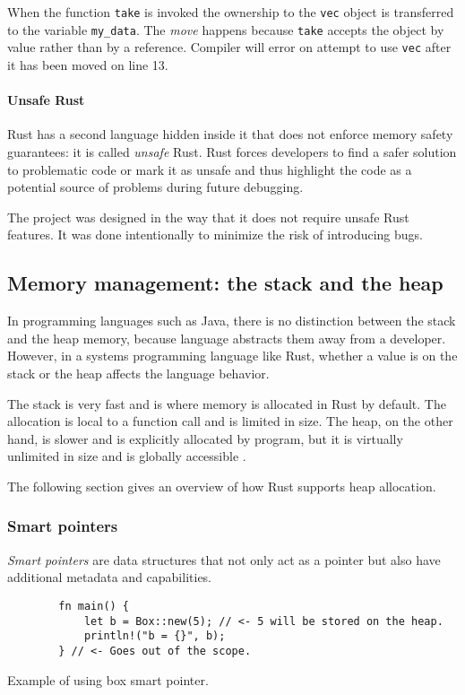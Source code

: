 When the function \texttt{take} is invoked the ownership to the \texttt{vec} object is transferred to the variable \texttt{my_data}. The \emph{move} happens because \texttt{take} accepts the object by value rather than by a reference. Compiler will error on attempt to use \texttt{vec} after it has been moved on line 13.

\paragraph{Unsafe Rust}
Rust has a second language hidden inside it that does not enforce memory safety guarantees: it is called \emph{unsafe} Rust. Rust forces developers to find a safer solution to problematic code or mark it as unsafe and thus highlight the code as a potential source of problems during future debugging.

The \pvecrs{} project was designed in the way that it does not require unsafe Rust features. It was done intentionally to minimize the risk of introducing bugs.

\subsection{Memory management: the stack and the heap}
In programming languages such as Java, there is no distinction between the stack and the heap memory, because language abstracts them away from a developer. However, in a systems programming language like Rust, whether a value is on the stack or the heap affects the language behavior.

The stack is very fast and is where memory is allocated in Rust by default. The allocation is local to a function call and is limited in size. The heap, on the other hand, is slower and is explicitly allocated by program, but it is virtually unlimited in size and is globally accessible \cite{rust-book-2e}.

The following section gives an overview of how Rust supports heap allocation.

\subsubsection*{Smart pointers}
\emph{Smart pointers} are data structures that not only act as a pointer but also have additional metadata and capabilities.

\begin{listing}[!ht]

    \centering
    \begin{verbatim}
        fn main() {
            let b = Box::new(5); // <- 5 will be stored on the heap.
            println!("b = {}", b);
        } // <- Goes out of the scope.
    \end{verbatim}

    \caption{Example of using box smart pointer.}
    \label{lst:box}
\end{listing}

